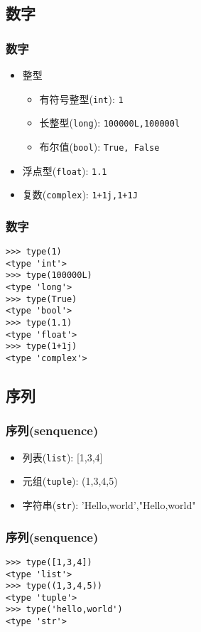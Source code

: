 \documentclass[13pt]{beamer}
\begin{document}
\subsection{数字}
\begin{frame}[containsverbatim]
\frametitle{数字}
\begin{itemize}
\item 整型
\begin{itemize}
  \item 有符号整型(\lstinline{int}): \lstinline{1}
  \item 长整型(\lstinline{long}): \lstinline{100000L,100000l}
  \item 布尔值(\lstinline{bool}): \lstinline{True, False}
\end{itemize}
\item 浮点型(\lstinline{float}): \lstinline{1.1}
\item 复数(\lstinline{complex}): \lstinline{1+1j,1+1J}
\end{itemize}
\end{frame}

\begin{frame}
\frametitle{数字}
\begin{lstlisting}
>>> type(1)
<type 'int'>
>>> type(100000L)
<type 'long'>
>>> type(True)
<type 'bool'>
>>> type(1.1)
<type 'float'>
>>> type(1+1j)
<type 'complex'>
\end{lstlisting}
\end{frame}

\subsection{序列}
\begin{frame}[containsverbatim]
\frametitle{序列(senquence)}
\begin{itemize}
\item 列表(\lstinline{list}): [1,3,4]
\item 元组(\lstinline{tuple}): (1,3,4,5)
\item 字符串(\lstinline{str}): 'Hello,world',"Hello,world"
\end{itemize}
\end{frame}

\begin{frame}[containsverbatim]
\frametitle{序列(senquence)}
\begin{lstlisting}
>>> type([1,3,4])
<type 'list'>
>>> type((1,3,4,5))
<type 'tuple'>
>>> type('hello,world')
<type 'str'>
\end{lstlisting}
\end{frame}
\end{document}
